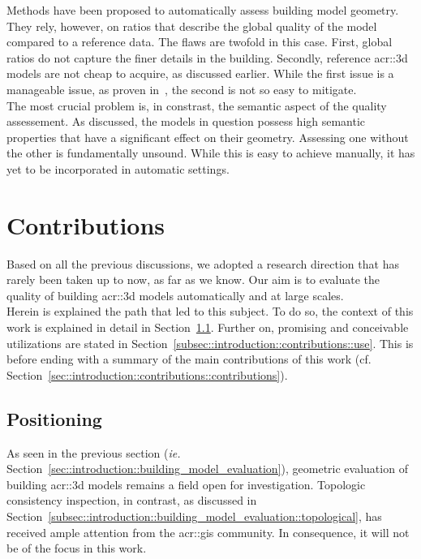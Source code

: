             Methods have been proposed to automatically assess building model geometry.
            They rely, however, on ratios that describe the global quality of the model compared to a reference data.
            The flaws are twofold in this case.
            First, global ratios do not capture the finer details in the building.
            Secondly, reference \gls{acr::3d} models are not cheap to acquire, as discussed earlier.
            While the first issue is a manageable issue, as proven in~\textcite{rottensteiner2012isprs}, the second is not so easy to mitigate.\\

            The most crucial problem is, in constrast, the semantic aspect of the quality assessement.
            As discussed, the models in question possess high semantic properties that have a significant effect on their geometry.
            Assessing one without the other is fundamentally unsound.
            While this is easy to achieve manually, it has yet to be incorporated in automatic settings.
\section{Contributions}
    \label{sec::introduction::contributions}
    Based on all the previous discussions, we adopted a research direction that has rarely been taken up to now, as far as we know.
    Our aim is to evaluate the quality of building \gls{acr::3d} models automatically and at large scales.\\

    Herein is explained the path that led to this subject.
    To do so, the context of this work is explained in detail in Section~\ref{subsec::introduction::contributions::positioning}.
    Further on, promising and conceivable utilizations are stated in Section~\ref{subsec::introduction::contributions::use}.
    This is before ending with a summary of the main contributions of this work (cf. Section~\ref{sec::introduction::contributions::contributions}).
    
    \subsection{Positioning}
        \label{subsec::introduction::contributions::positioning}
        As seen in the previous section (\textit{ie.} Section~\ref{sec::introduction::building_model_evaluation}), geometric evaluation of building \gls{acr::3d} models remains a field open for investigation.
        Topologic consistency inspection, in contrast, as discussed in Section~\ref{subsec::introduction::building_model_evaluation::topological}, has received ample attention from the \gls{acr::gis} community.
        In consequence, it will not be of the focus in this work.\\

